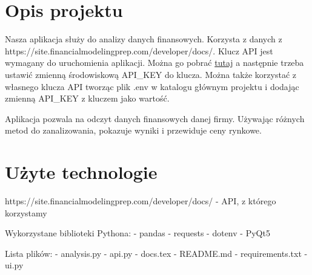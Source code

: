 \documentclass[12pt]{article}
\begin{document}
	\maketitle
	
	\section{Opis projektu}\label{sec:opis-projektu}
	Nasza aplikacja służy do analizy danych finansowych.
	Korzysta z danych z https://site.financialmodelingprep.com/developer/docs/.
	Klucz API jest wymagany do uruchomienia aplikacji.
	Można go pobrać \href{https://site.financialmodelingprep.com/login}{tutaj} a następnie
	trzeba ustawić zmienną środowiskową API\_KEY do klucza.
	Można także korzystać z własnego klucza API tworząc plik .env w katalogu głównym projektu i
	dodając zmienną API\_KEY z kluczem jako wartość.

	Aplikacja pozwala na odczyt danych finansowych danej firmy.
	Używając różnych metod do zanalizowania, pokazuje wyniki i przewiduje ceny rynkowe.

	\section{Użyte technologie}\label{sec:uzyte-technologie}
	 https://site.financialmodelingprep.com/developer/docs/ - API, z którego korzystamy

	Wykorzystane biblioteki Pythona:
	- pandas
	- requests
	- dotenv
	- PyQt5

	Lista plików:
	- analysis.py
	- api.py
	- docs.tex
	- README.md
	- requirements.txt
	- ui.py
\end{document}
